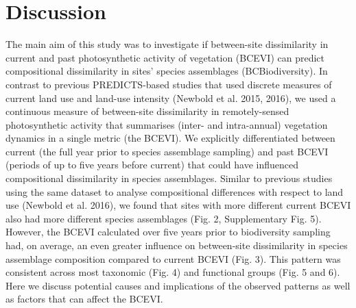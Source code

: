 \section{Discussion}
The main aim of this study was to investigate if between-site dissimilarity in current and past photosynthetic activity of vegetation (BCEVI) can predict compositional dissimilarity in sites’ species assemblages (BCBiodiversity). In contrast to previous PREDICTS-based studies that used discrete measures of current land use and land-use intensity (Newbold et al. 2015, 2016), we used a continuous measure of between-site dissimilarity in remotely-sensed photosynthetic activity that summarises (inter- and intra-annual) vegetation dynamics in a single metric (the BCEVI). We explicitly differentiated between current (the full year prior to species assemblage sampling) and past BCEVI (periods of up to five years before current) that could have influenced compositional dissimilarity in species assemblages. Similar to previous studies using the same dataset to analyse compositional differences with respect to land use (Newbold et al. 2016), we found that sites with more different current BCEVI also had more different species assemblages (Fig. 2, Supplementary Fig. 5). However, the BCEVI calculated over five years prior to biodiversity sampling had, on average, an even greater influence on between-site dissimilarity in species assemblage composition compared to current BCEVI (Fig. 3). This pattern was consistent across most taxonomic (Fig. 4) and functional groups (Fig. 5 and 6). Here we discuss potential causes and implications of the observed patterns as well as factors that can affect the BCEVI.

